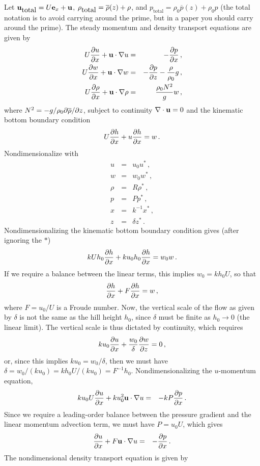 \documentclass[12pt]{article}
\begin{document}
Let $\mathbf{u}_{\mbox{total}} = U {\bf e}_x + \mathbf{u}$, $\rho_{\mbox{total}} = \overline{\rho}(z) + \rho$, and
$p_{\mbox{total}} = \rho_0 \overline{p}(z) + \rho_0 p$ (the total notation is
to avoid carrying around the prime, but in a paper you should carry around the prime).
The steady momentum and density transport equations are given by
\begin{eqnarray}
U \frac{\partial{u}}{\partial{x}} + \mathbf{u}\cdot\nabla u &=& -\frac{\partial{p}}{\partial{x}}\,,\\
U \frac{\partial{w}}{\partial{x}} + \mathbf{u}\cdot\nabla w &=& -\frac{\partial{p}}{\partial{z}} - \frac{\rho}{\rho_0} g\,,\\
U \frac{\partial{\rho}}{\partial{x}} + \mathbf{u}\cdot\nabla\rho &=& \frac{\rho_0 N^2}{g} w\,,
\end{eqnarray}
where $N^2 = -g/\rho_0 \partial\overline{\rho}/\partial z$, subject to continuity $\nabla\cdot\mathbf{u}=0$ and
the kinematic bottom boundary condition
\[
U\frac{\partial{h}}{\partial{x}} + u \frac{\partial{h}}{\partial{x}} = w\,.
\]  
Nondimensionalize with
\begin{eqnarray*}
u &=& u_0 u^*\,,\\
w &=& w_0 w^*\,,\\
\rho &=& R \rho^*\,,\\
p &=& P p^*\,,\\
x &=& k^{-1} x^*\,,\\
z &=& \delta z^*\,.
\end{eqnarray*}
Nondimensionalizing the kinematic bottom boundary condition gives
(after ignoring the $*$)
\[
k U h_0 \frac{\partial{h}}{\partial{x}} + k u_0 h_0 \frac{\partial{h}}{\partial{x}} = w_0 w\,.
\]
If we require a balance between the linear terms, this implies $w_0 = k h_0 U$, so that
\[
\frac{\partial{h}}{\partial{x}} + F \frac{\partial{h}}{\partial{x}} = w\,,
\]
where $F = u_0/U$ is a Froude number. Now, the vertical scale of the flow as given by $\delta$ is not the
same as the hill height $h_0$, since $\delta$ must be finite as $h_0\to 0$ (the linear limit). The 
vertical scale is thus dictated by continuity, which requires
\[
k u_0 \frac{\partial{u}}{\partial{x}} + \frac{w_0}{\delta} \frac{\partial{w}}{\partial{z}} = 0\,,
\]
or, since this implies $k u_0 = w_0/\delta$, then we must have $\delta = w_0/(k u_0) = k h_0 U/(k u_0) = F^{-1} h_0$.
Nondimensionalizing the $u$-momentum equation,
\begin{eqnarray}
k u_0 U \frac{\partial{u}}{\partial{x}} + k u_0^2\mathbf{u}\cdot\nabla u  &=& -k P \frac{\partial{p}}{\partial{x}}\,.
\end{eqnarray}
Since we require a leading-order balance between the pressure gradient and the linear momentum advection term,
we must have $P = u_0 U$, which gives
\begin{eqnarray}
\frac{\partial{u}}{\partial{x}} + F \mathbf{u}\cdot\nabla u &=& -\frac{\partial{p}}{\partial{x}}\,.
\end{eqnarray}
The nondimensional density transport equation is given by
\end{document}
